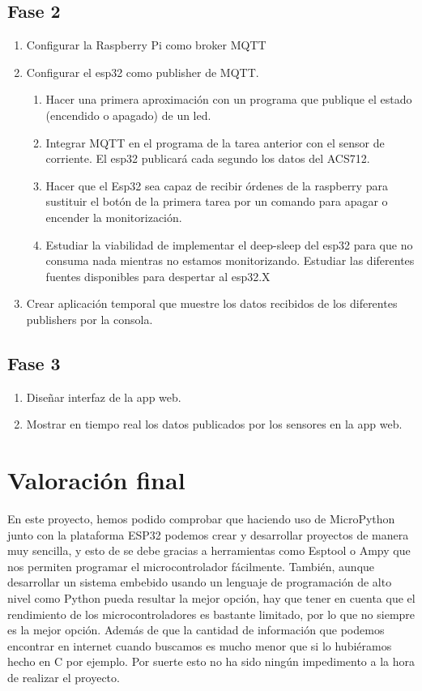 \begin{titlepage}
\subsection{Fase 2}
\begin{enumerate}
    \item Configurar la Raspberry Pi como broker MQTT
    \item Configurar el esp32 como publisher de MQTT.
    \begin{enumerate}
        \item Hacer una primera aproximación con un programa que publique el estado (encendido o apagado) de un led. \checkmark
        \item Integrar MQTT en el programa de la tarea anterior con el sensor de corriente. El esp32 publicará cada segundo los datos del ACS712. \checkmark
        \item Hacer que el Esp32 sea capaz de recibir órdenes de la raspberry para sustituir el botón de la primera tarea por un comando para apagar o encender la monitorización. \checkmark
        \item Estudiar la viabilidad de implementar el deep-sleep del esp32 para que no consuma nada mientras no estamos monitorizando. Estudiar las diferentes fuentes disponibles para despertar al esp32.X
    \end{enumerate}
    \item Crear aplicación temporal que muestre los datos recibidos de los diferentes publishers por la consola. \checkmark
\end{enumerate}


\subsection{Fase 3}
\begin{enumerate}
    \item Diseñar interfaz de la app web. \checkmark
    \item Mostrar en tiempo real los datos publicados por los sensores en la app web. \checkmark
\end{enumerate}

\section{Valoración final}
En este proyecto, hemos podido comprobar que haciendo uso de MicroPython junto con la plataforma ESP32 podemos crear y desarrollar proyectos de manera muy sencilla, y esto de se debe gracias a herramientas como Esptool o Ampy que nos permiten programar el microcontrolador fácilmente. También, aunque desarrollar un sistema embebido usando un lenguaje de programación de alto nivel como Python pueda resultar la mejor opción, hay que tener en cuenta que el rendimiento de los microcontroladores es bastante limitado, por lo que no siempre es la mejor opción. Además de que la cantidad de información que podemos encontrar en internet cuando buscamos es mucho menor que si lo hubiéramos hecho en C por ejemplo. Por suerte esto no ha sido ningún impedimento a la hora de realizar el proyecto.\\


\end{titlepage}
